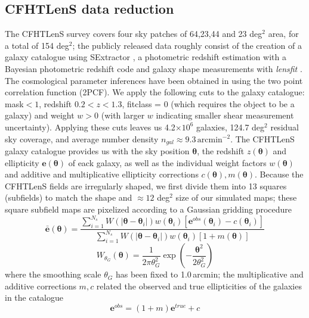 \documentclass[reprint,aps,prd,superscriptaddress,showkeys,showpacs]{revtex4-1}
\begin{document}
\subsection{CFHTLenS data reduction}
\label{cfhtdatareduction}
%
The CFHTLenS survey covers four sky patches of 64,23,44 and 23 deg$^2$ area, for a total of 154 deg$^2$; the publicly released data roughly consist of the creation of a galaxy catalogue using SExtractor \citep{SExtractor}, a photometric redshift estimation with a Bayesian photometric redshift code \citep{PhotoCode} and galaxy shape measurements with \textit{lensfit} \citep{cfht1,cfht2}. The cosmological parameter inferences have been obtained in \citep{CFHTKilbinger} using the two point correlation function (2PCF). We apply the following cuts to the galaxy catalogue: mask$<1$, redshift $0.2 < z < 1.3$, fitclass = 0 (which requires the object to be a galaxy) and weight $w>0$ (with larger $w$ indicating smaller shear measurement uncertainty). Applying these cuts leaves us 4.2$\times10^6$ galaxies, 124.7 deg$^2$ residual sky coverage, and average number density $n_{gal} \approx 9.3\,\mathrm{arcmin}^{-2}$. The CFHTLenS galaxy catalogue provides us with the sky position $\pmb{\theta}$, the redshift $z(\pmb{\theta})$ and ellipticity $\mathbf{e}(\pmb{\theta})$ of eack galaxy, as well as the individual weight factors $w(\pmb{\theta})$ and additive and multiplicative ellipticity corrections $c(\pmb{\theta}),m(\pmb{\theta})$. Because the CFHTLenS fields are irregularly shaped, we first divide them into 13 squares (subfields) to match the shape and $\approx12$ deg$^2$ size of our simulated maps; these square subfield maps are pixelized according to a Gaussian gridding procedure
\begin{equation}
\bar{\mathbf{e}}(\pmb{\theta}) = \frac{\sum_{i=1}^{N_s} W(\vert\pmb{\theta}-\pmb{\theta}_i\vert)w(\pmb{\theta}_i)[\mathbf{e}^{obs}(\pmb{\theta}_i)-c(\pmb{\theta}_i)]}{\sum_{i=1}^{N_s}W(\vert\pmb{\theta}-\pmb{\theta}_i\vert)w(\pmb{\theta}_i)[1+m(\pmb{\theta})]}
\end{equation} 
\begin{equation}
\label{gausskernel}
W_{\theta_G}(\pmb{\theta}) = \frac{1}{2\pi\theta_G^2}\exp{\left(-\frac{\pmb{\theta}^2}{2\theta_G^2}\right)}
\end{equation}
%
where the smoothing scale $\theta_G$ has been fixed to 1.0\,arcmin; the multiplicative and additive corrections $m,c$ related the observed and true ellipticities of the galaxies in the catalogue
\begin{equation}
\mathbf{e}^{obs} = (1+m)\mathbf{e}^{true} + c
\end{equation}
\end{document}
